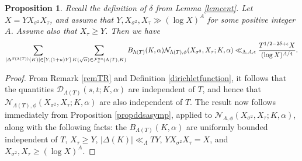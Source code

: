 \documentclass[10pt]{article}
\theoremstyle{plain}
\newtheorem{proposition}[thm]{Proposition}
\theoremstyle{definition}
\theoremstyle{remark}
\def\un{{\rm un}}
\def\FF{{\mathcal F}}
\def\cD{{\mathcal D}}
\def\cN{{\mathcal N}}
\begin{document}
\begin{proposition}\label{propntrivalB}
Recall the definition of $\delta$ from Lemma \ref{lemcent}. Let $X = YX_{\sigma^2}X_\tau$, and assume that
  $Y,X_{\sigma^2},X_\tau\gg (\log X)^A$ for some positive integer
  $A$. Assume also that $X_\tau\geq Y$.  Then we have
\begin{equation*}  
\sum_{|\Delta^{S(\Lambda(T))}(K)|\in[Y,(1+\kappa)Y]}
\sum_{K(\sqrt{\alpha})\in\FF_4^\un(\Lambda(T),K)}B_{\Lambda(T)}(K,\alpha)
\cN_{\Lambda(T),\phi}(X_{\sigma^2},X_\tau;K,\alpha)
\ll_{\Lambda,A,\epsilon} \frac{T^{1/2-2\delta+\epsilon}X}{(\log X)^{A/4}}.
\end{equation*}
\end{proposition}
\begin{proof}
From Remark \ref{remTR} and Definition \ref{dirichletfunction}, it follows that
the quantities $\cD_{\Lambda(T)}(s,t;K,\alpha)$ are independent of $T$, and hence
that $\cN_{\Lambda(T),\phi}(X_{\sigma^2},X_\tau;K,\alpha)$ are also
independent of $T$. The result now follows immediately from
Proposition \ref{propddsasymp}, applied to
$\cN_{\Lambda,\phi}(X_{\sigma^2},X_\tau;K,\alpha)$, along with the
following facts: the $B_{\Lambda(T)}(K,\alpha)$ are uniformly bounded
independent of $T$, $X_\tau\geq Y$, $|\Delta(K)|\ll_\Lambda TY$,
$YX_{\sigma^2}X_\tau=X$, and $X_{\sigma^2},X_\tau\geq (\log X)^A$.
\end{proof}
\end{document}
